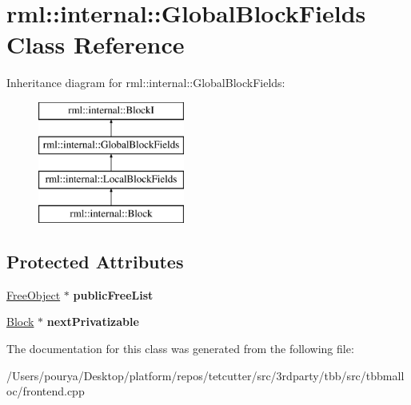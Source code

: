 \hypertarget{classrml_1_1internal_1_1GlobalBlockFields}{}\section{rml\+:\+:internal\+:\+:Global\+Block\+Fields Class Reference}
\label{classrml_1_1internal_1_1GlobalBlockFields}
Inheritance diagram for rml\+:\+:internal\+:\+:Global\+Block\+Fields\+:\begin{figure}[H]
\begin{center}
\leavevmode
\includegraphics[height=4.000000cm]{classrml_1_1internal_1_1GlobalBlockFields}
\end{center}
\end{figure}
\subsection*{Protected Attributes}
\begin{DoxyCompactItemize}
\item 
\hypertarget{classrml_1_1internal_1_1GlobalBlockFields_a250f5629d8827f1821cd6a318d1d6b9b}{}\hyperlink{structrml_1_1internal_1_1FreeObject}{Free\+Object} $\ast$ {\bfseries public\+Free\+List}\label{classrml_1_1internal_1_1GlobalBlockFields_a250f5629d8827f1821cd6a318d1d6b9b}

\item 
\hypertarget{classrml_1_1internal_1_1GlobalBlockFields_a1360a23b724f8505caeb81b21eab0c59}{}\hyperlink{classrml_1_1internal_1_1Block}{Block} $\ast$ {\bfseries next\+Privatizable}\label{classrml_1_1internal_1_1GlobalBlockFields_a1360a23b724f8505caeb81b21eab0c59}

\end{DoxyCompactItemize}


The documentation for this class was generated from the following file\+:\begin{DoxyCompactItemize}
\item 
/\+Users/pourya/\+Desktop/platform/repos/tetcutter/src/3rdparty/tbb/src/tbbmalloc/frontend.\+cpp\end{DoxyCompactItemize}
